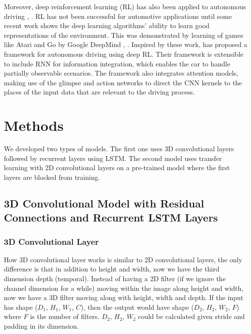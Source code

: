 \documentclass[10pt,twocolumn,letterpaper]{article}
\begin{document}
Moreover, deep reinforcement learning (RL) has also been applied to autonomous driving \cite{el2017deep}, \cite{shalev2016safe}. RL has not been successful for automotive applications until some recent work shows the deep learning algorithms’ ability to learn good representations of the environment. This was demonstrated by learning of games like Atari and Go by Google DeepMind \cite{mnih2013playing}, \cite{silver2016mastering}. Inspired by these work, \cite{el2017deep} has proposed a framework for autonomous driving using deep RL. Their framework is extensible to include RNN for information integration, which enables the car to handle partially observable scenarios. The framework also integrates attention models,  making use of the glimpse and action networks to direct the CNN kernels to the places of the input data that are relevant to the driving process.



\section{Methods}

We developed two types of models. The first one uses 3D convolutional layers followed by recurrent layers using LSTM. The second model uses transfer learning with 2D convolutional layers on a pre-trained model where the first layers are blocked from training.



\subsection{3D Convolutional Model with Residual Connections and Recurrent LSTM Layers}

\subsubsection{3D Convolutional Layer}
How 3D convolutional layer works is similar to 2D convolutional layers, the only difference is that in addition to height and width, now we have the third dimension depth (temporal). Instead of having a 2D filter (if we ignore the channel dimension for a while) moving within the image along height and width, now we have a 3D filter moving along with height, width and depth. If the input has shape ($D_1$, $H_1$,  $W_1$, $C$), then the output would have shape ($D_2$, $H_2$, $W_2$, $F$) where $F$ is the number of filters. $D_2$, $H_2$, $W_2$ could be calculated given stride and padding in its dimension.
\end{document}
